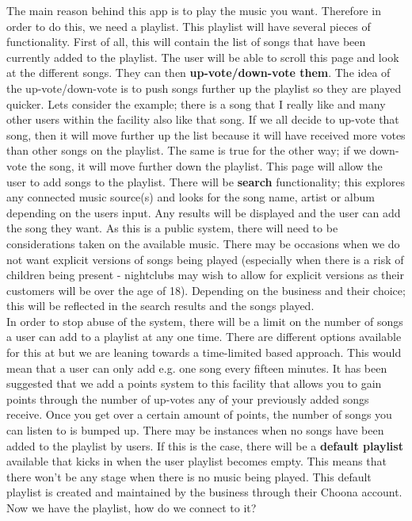The main reason behind this app is to play the music you want.  Therefore in order to do this, we need a playlist.   This playlist will have several pieces of functionality.  First of all, this will contain the list of songs that have been currently added to the playlist.  The user will be able to scroll this page and look at the different songs.  They can then \textbf{up-vote/down-vote them}.  The idea of the up-vote/down-vote is to push songs further up the playlist so they are played quicker.  Lets consider the example; there is a song that I really like and many other users within the facility also like that song.  If we all decide to up-vote that song, then it will move further up the list because it will have received more votes than other songs on the playlist.  The same is true for the other way; if we down-vote the song, it will move further down the playlist.  This page will allow the user to add songs to the playlist.  There will be \textbf{search} functionality; this explores any connected music source(s) and looks for the song name, artist or album depending on the users input.  Any results will be displayed and the user can add the song they want.  As this is a public system, there will need to be considerations taken on the available music.  There may be occasions when we do not want explicit versions of songs being played (especially when there is a risk of children being present - nightclubs may wish to allow for explicit versions as their customers will be over the age of 18).  Depending on the business and their choice; this will be reflected in the search results and the songs played.\\
In order to stop abuse of the system, there will be a limit on the number of songs a user can add to a playlist at any one time.  There are different options available for this at but we are leaning towards a time-limited based approach.  This would mean that a user can only add e.g. one song every fifteen minutes.  It has been suggested that we add a points system to this facility that allows you to gain points through the number of up-votes any of your previously added songs receive.  Once you get over a certain amount of points, the number of songs you can listen to is bumped up.  
There may be instances when no songs have been added to the playlist by users.  If this is the case, there will be a \textbf{default playlist} available that kicks in when the user playlist becomes empty.  This means that there won't be any stage when there is no music being played.  This default playlist is created and maintained by the business through their Choona account.  Now we have the playlist, how do we connect to it?\\

